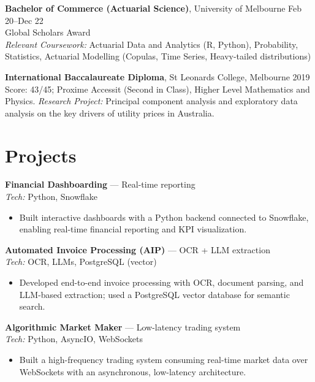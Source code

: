 \documentclass[10pt,letterpaper]{article}
\begin{document}
\textbf{Bachelor of Commerce (Actuarial Science)}, University of Melbourne \hfill Feb 20--Dec 22\\
Global Scholars Award\\
\emph{Relevant Coursework:} Actuarial Data and Analytics (R, Python), Probability, Statistics, Actuarial Modelling (Copulas, Time Series, Heavy-tailed distributions)

\textbf{International Baccalaureate Diploma}, St Leonards College, Melbourne \hfill 2019\\
Score: 43/45; Proxime Accessit (Second in Class), Higher Level Mathematics and Physics.
\emph{Research Project:} Principal component analysis and exploratory data analysis on the key drivers of utility prices in Australia.

\section*{Projects}

\textbf{Financial Dashboarding} — Real-time reporting \hfill \\
\emph{Tech:} Python, Snowflake\\[-1.5em]
\begin{itemize}
  \item Built interactive dashboards with a Python backend connected to Snowflake, enabling real-time financial reporting and KPI visualization.
\end{itemize}

\textbf{Automated Invoice Processing (AIP)} — OCR + LLM extraction \hfill \\
\emph{Tech:} OCR, LLMs, PostgreSQL (vector)\\[-1.5em]
\begin{itemize}
  \item Developed end-to-end invoice processing with OCR, document parsing, and LLM-based extraction; used a PostgreSQL vector database for semantic search.
\end{itemize}

\textbf{Algorithmic Market Maker} — Low-latency trading system \hfill \\
\emph{Tech:} Python, AsyncIO, WebSockets\\[-1.5em]
\begin{itemize}
  \item Built a high-frequency trading system consuming real-time market data over WebSockets with an asynchronous, low-latency architecture.
\end{itemize}
\end{document}
